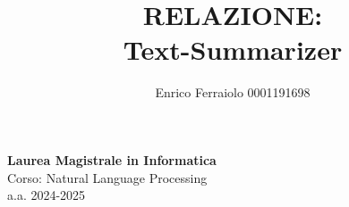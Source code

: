 \documentclass[a4paper, 12pt]{article}
\title{\textbf{RELAZIONE: \\ Text-Summarizer}}
\author{Enrico Ferraiolo 0001191698}
\date{}
\begin{document}
\maketitle

\begin{center}
    \textbf{Laurea Magistrale in Informatica}\\
    \vspace{0.3cm}
    Corso: Natural Language Processing \\
    a.a. 2024-2025
    \vspace{2cm}
\end{center}

\newpage

\tableofcontents
\newpage






%

\end{document}
